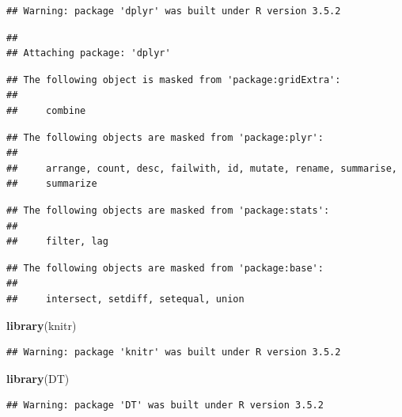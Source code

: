 \documentclass[man]{apa6}
\newenvironment{Shaded}{\begin{snugshade}}{\end{snugshade}}
\newcommand{\DataTypeTok}[1]{\textcolor[rgb]{0.13,0.29,0.53}{#1}}
\newcommand{\KeywordTok}[1]{\textcolor[rgb]{0.13,0.29,0.53}{\textbf{#1}}}
\newcommand{\NormalTok}[1]{#1}
\newcommand{\OperatorTok}[1]{\textcolor[rgb]{0.81,0.36,0.00}{\textbf{#1}}}
\newcommand{\StringTok}[1]{\textcolor[rgb]{0.31,0.60,0.02}{#1}}
\begin{document}
\begin{verbatim}
## Warning: package 'dplyr' was built under R version 3.5.2
\end{verbatim}

\begin{verbatim}
## 
## Attaching package: 'dplyr'
\end{verbatim}

\begin{verbatim}
## The following object is masked from 'package:gridExtra':
## 
##     combine
\end{verbatim}

\begin{verbatim}
## The following objects are masked from 'package:plyr':
## 
##     arrange, count, desc, failwith, id, mutate, rename, summarise,
##     summarize
\end{verbatim}

\begin{verbatim}
## The following objects are masked from 'package:stats':
## 
##     filter, lag
\end{verbatim}

\begin{verbatim}
## The following objects are masked from 'package:base':
## 
##     intersect, setdiff, setequal, union
\end{verbatim}

\begin{Shaded}
\begin{Highlighting}[]
\KeywordTok{library}\NormalTok{(knitr)}
\end{Highlighting}
\end{Shaded}

\begin{verbatim}
## Warning: package 'knitr' was built under R version 3.5.2
\end{verbatim}

\begin{Shaded}
\begin{Highlighting}[]
\KeywordTok{library}\NormalTok{(DT)}
\end{Highlighting}
\end{Shaded}

\begin{verbatim}
## Warning: package 'DT' was built under R version 3.5.2
\end{verbatim}

\begin{Shaded}
\end{Shaded}
\end{document}
